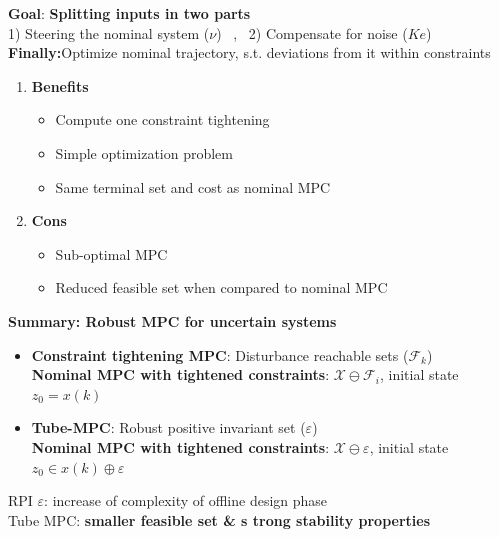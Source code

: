 \textbf{Goal}: \textbf{Splitting inputs in two parts}\\
1) Steering the nominal system ($\nu$) \, , \,
2) Compensate for noise ($Ke$)\\
\textbf{Finally:}Optimize nominal trajectory, s.t. deviations from it within constraints
\begin{enumerate}
    \item \textbf{Benefits}
    \begin{itemize}
        \item Compute one constraint tightening
        \item Simple optimization problem
        \item Same terminal set and cost as nominal MPC
    \end{itemize}
    \item \textbf{Cons}
    \begin{itemize}
        \item Sub-optimal MPC
        \item Reduced feasible set when compared to nominal MPC
    \end{itemize}
\end{enumerate}
\textbf{Summary: Robust MPC for uncertain systems}
\begin{itemize}
    \item \textbf{Constraint tightening MPC}: Disturbance reachable sets ($\mathcal{F}_k$)\\
    \Rightarrow \textbf{Nominal MPC with tightened constraints}: $\mathcal{X}\ominus\mathcal{F}_i$, initial state $z_0=x(k)$
    \item \textbf{Tube-MPC}: Robust positive invariant set ($\varepsilon$)\\
    \Rightarrow \textbf{Nominal MPC with tightened constraints}: $\mathcal{X}\ominus\varepsilon$, initial state $z_0\in x(k)\oplus\varepsilon$
\end{itemize}
\rightarrow RPI $\varepsilon$: increase of complexity of offline design phase\\
\rightarrow Tube MPC: \textbf{smaller feasible set \& s                     trong stability properties}





